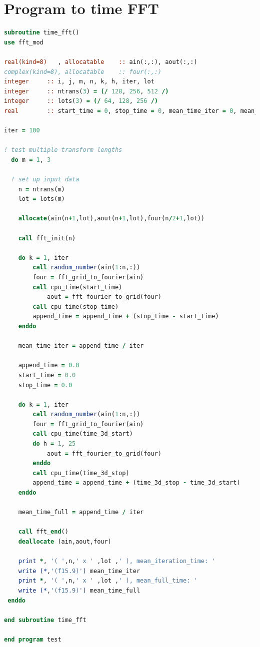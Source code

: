 \documentclass[a4paper,11pt]{report}
\begin{document}
\section*{Program to time FFT}
\begin{lstlisting}[language=Fortran, caption={Program used to time how long it takes to perform a Fast Fourier Transform.}]
subroutine time_fft()
use fft_mod

real(kind=8)   , allocatable 	:: ain(:,:), aout(:,:)
complex(kind=8), allocatable 	:: four(:,:)
integer 	:: i, j, m, n, k, h, iter, lot
integer 	:: ntrans(3) = (/ 128, 256, 512 /)
integer 	:: lots(3) = (/ 64, 128, 256 /)
real 	    :: start_time = 0, stop_time = 0, mean_time_iter = 0, mean_time_full = 0, append_time = 0, time_3d_start = 0, time_3d_stop = 0

iter = 100

! test multiple transform lengths
  do m = 1, 3

  ! set up input data
    n = ntrans(m)
    lot = lots(m)

    allocate(ain(n+1,lot),aout(n+1,lot),four(n/2+1,lot))

    call fft_init(n)

    do k = 1, iter
        call random_number(ain(1:n,:))
        four = fft_grid_to_fourier(ain)
        call cpu_time(start_time)
            aout = fft_fourier_to_grid(four)
        call cpu_time(stop_time)
        append_time = append_time + (stop_time - start_time)
    enddo

    mean_time_iter = append_time / iter

    append_time = 0.0
    start_time = 0.0
    stop_time = 0.0

    do k = 1, iter
        call random_number(ain(1:n,:))
        four = fft_grid_to_fourier(ain)
        call cpu_time(time_3d_start)
        do h = 1, 25
            aout = fft_fourier_to_grid(four)
        enddo
        call cpu_time(time_3d_stop)
        append_time = append_time + (time_3d_stop - time_3d_start)
    enddo

    mean_time_full = append_time / iter

    call fft_end()
    deallocate (ain,aout,four)

    print *, '( ',n,' x ' ,lot ,' ), mean_iteration_time: '
    write (*,'(f15.9)') mean_time_iter
    print *, '( ',n,' x ' ,lot ,' ), mean_full_time: '
    write (*,'(f15.9)') mean_time_full
 enddo

end subroutine time_fft

end program test
\end{lstlisting}
\end{document}
